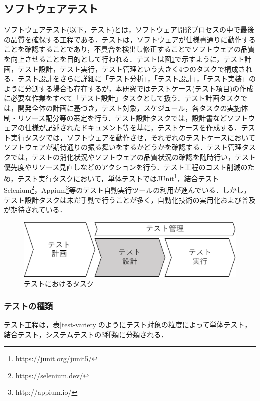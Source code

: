 \documentclass[12pt]{jarticle} %
\begin{document}
\subsection{ソフトウェアテスト}
ソフトウェアテスト(以下，テスト)とは，ソフトウェア開発プロセスの中で最後の品質を確保する工程である．テストは，ソフトウェアが仕様書通りに動作することを確認することであり，不具合を検出し修正することでソフトウェアの品質を向上させることを目的として行われる．テストは図\ref{testtask}で示すように，テスト計画，テスト設計，テスト実行，テスト管理という大きく4つのタスクで構成される．テスト設計をさらに詳細に「テスト分析」，「テスト設計」，「テスト実装」のように分割する場合も存在するが，本研究ではテストケース(テスト項目)の作成に必要な作業をすべて「テスト設計」タスクとして扱う．テスト計画タスクでは，開発全体の計画に基づき，テスト対象，スケジュール，各タスクの実施体制・リソース配分等の策定を行う．テスト設計タスクでは，設計書などソフトウェアの仕様が記述されたドキュメント等を基に，テストケースを作成する．テスト実行タスクでは，ソフトウェアを動作させ，それぞれのテストケースにおいてソフトウェアが期待通りの振る舞いをするかどうかを確認する．テスト管理タスクでは，テストの消化状況やソフトウェアの品質状況の確認を随時行い，テスト優先度やリソース見直しなどのアクションを行う．テスト工程のコスト削減のため，テスト実行タスクにおいて，単体テストではJUnit\footnote{https://junit.org/junit5/}，結合テストSelenium\footnote{https://selenium.dev/}，Appium\footnote{http://appium.io/}等のテスト自動実行ツールの利用が進んでいる．しかし，テスト設計タスクは未だ手動で行うことが多く，自動化技術の実用化および普及が期待されている．

\begin{figure}[htbp]
\begin{center}
\includegraphics[clip,width=12cm]{test-task.pdf}
\caption{テストにおけるタスク}
\label{testtask}
\end{center}
\end{figure}

\subsubsection{テストの種類}

テスト工程は，表\ref{test-variety}のようにテスト対象の粒度によって単体テスト，結合テスト，システムテストの3種類に分類される．
\end{document}

